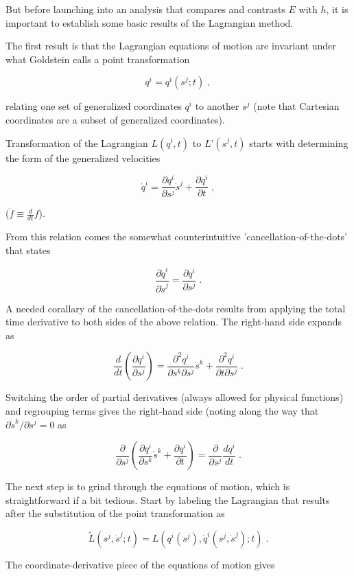 \documentclass[12pt]{article}
\begin{document}
But before launching into an analysis that compares and contrasts $E$ with $h$, it is important to establish some basic results of the Lagrangian method.  

The first result is that the Lagrangian equations of motion are invariant under what Goldstein calls a point transformation

\[ q^i = q^i(s^j;t) \; , \]

relating one set of generalized coordinates $q^i$ to another $s^j$ (note that Cartesian coordinates are a subset of generalized coordinates). 

Transformation of the Lagrangian $L(q^i,t)$ to $L’(s^j,t)$ starts with determining the form of the generalized velocities

\[ {\dot q}^i = \frac{\partial q^i}{\partial s^j} {\dot s}^j + \frac{\partial q^i}{\partial t} \; , \]

($\dot f \equiv \frac{d}{dt} f$).

From this relation comes the somewhat counterintuitive 'cancellation-of-the-dots' that states

\[ \frac{\partial {\dot q}^i}{\partial {\dot s}^j} = \frac{\partial q^i}{\partial s^j} \; .\]

A needed corallary of the cancellation-of-the-dots results from applying the total time derivative to both sides of the above relation.  The right-hand side expands as

\[ \frac{d}{dt} \left(  \frac{\partial q^i}{\partial s^j} \right) = \frac{\partial^2 q^i}{\partial s^k \partial s^j} {\dot s}^k + \frac{\partial^2 q^i}{\partial t \partial s^j} \; .\]

Switching the order of partial derivatives (always allowed for physical functions) and regrouping terms gives the right-hand side (noting along the way that $\partial {\dot s}^k / \partial s^j = 0 $ as

\[ \frac{\partial}{\partial s^j} \left( \frac{\partial q^i}{\partial s^k} {\dot s}^k + \frac{\partial q^i}{\partial t} \right) = \frac{\partial}{\partial s^j} \frac{d q^i}{d t} \; . \]

The next step is to grind through the equations of motion, which is straightforward if a bit tedious.  Start by labeling the Lagrangian that results after the substitution of the point transformation as

\[ \tilde L (s^j,{\dot s}^j;t ) = L (q^i(s^j),{\dot q}^i(s^j,{\dot s}^j);t ) \; .\]

The coordinate-derivative piece of the equations of motion gives
\end{document}
